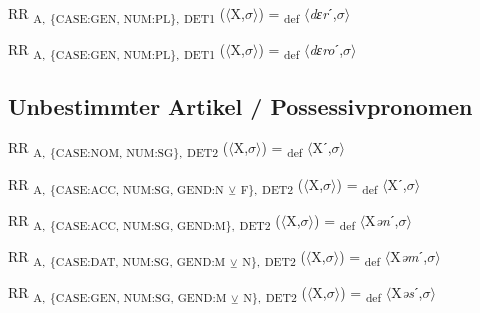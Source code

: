 {\begin{exe}
 RR \textsubscript{A,} \textsubscript{\{CASE:GEN, NUM:PL\},} \textsubscript{DET1} ($\langle$X,$\sigma $$\rangle$) = \textsubscript{def} $\langle$\textit{dɛr}ˊ,$\sigma $$\rangle$
\end{exe}

\begin{exe}
 RR \textsubscript{A,} \textsubscript{\{CASE:GEN, NUM:PL\},} \textsubscript{DET1} ($\langle$X,$\sigma $$\rangle$) = \textsubscript{def} $\langle$\textit{dɛro}ˊ,$\sigma $$\rangle$
\end{exe}

\subsection{Unbestimmter Artikel / Possessivpronomen}

\begin{exe}
 RR \textsubscript{A,} \textsubscript{\{CASE:NOM, NUM:SG\},} \textsubscript{DET2} ($\langle$X,$\sigma $$\rangle$) = \textsubscript{def} $\langle$Xˊ,$\sigma $$\rangle$
\end{exe}

\begin{exe}
 RR \textsubscript{A,} \textsubscript{\{CASE:ACC, NUM:SG, GEND:N} \textsubscript{${\veebar}$}\textsubscript{ F\},} \textsubscript{DET2} ($\langle$X,$\sigma $$\rangle$) = \textsubscript{def} $\langle$Xˊ,$\sigma $$\rangle$
\end{exe}

\begin{exe}
 RR \textsubscript{A,} \textsubscript{\{CASE:ACC, NUM:SG, GEND:M\},} \textsubscript{DET2} ($\langle$X,$\sigma $$\rangle$) = \textsubscript{def} $\langle$X\textit{ən}ˊ,$\sigma $$\rangle$
\end{exe}

\begin{exe}
 RR \textsubscript{A,} \textsubscript{\{CASE:DAT, NUM:SG, GEND:M} \textsubscript{${\veebar}$}\textsubscript{ N\},} \textsubscript{DET2} ($\langle$X,$\sigma $$\rangle$) = \textsubscript{def} $\langle$X\textit{əm}ˊ,$\sigma $$\rangle$
\end{exe}

\begin{exe}
 RR \textsubscript{A,} \textsubscript{\{CASE:GEN, NUM:SG, GEND:M} \textsubscript{${\veebar}$}\textsubscript{ N\},} \textsubscript{DET2} ($\langle$X,$\sigma $$\rangle$) = \textsubscript{def} $\langle$X\textit{əs}ˊ,$\sigma $$\rangle$
\end{exe}

}
